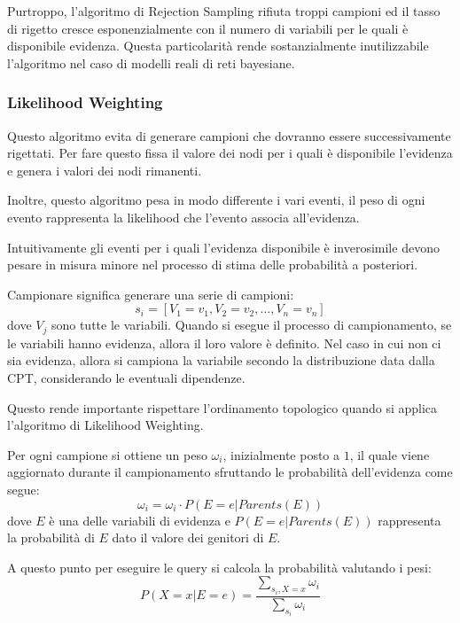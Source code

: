 Purtroppo, l'algoritmo di Rejection Sampling rifiuta troppi campioni ed il tasso
di rigetto cresce esponenzialmente con il numero di variabili per le quali è
disponibile evidenza. Questa particolarità rende sostanzialmente inutilizzabile
l'algoritmo nel caso di modelli reali di reti bayesiane.

\subsubsection{Likelihood Weighting}
Questo algoritmo evita di generare campioni che dovranno essere successivamente
rigettati. Per fare questo fissa il valore dei nodi per i quali è disponibile
l'evidenza e genera i valori dei nodi rimanenti.

Inoltre, questo algoritmo pesa in modo differente i vari eventi, il peso di ogni
evento rappresenta la likelihood che l'evento associa all'evidenza.

Intuitivamente gli eventi per i quali l'evidenza disponibile è inverosimile devono
pesare in misura minore nel processo di stima delle probabilità a posteriori.

Campionare significa generare una serie di campioni:
\begin{equation*}
    s_i = \left[V_1=v_1, V_2= v_2, \dots, V_n=v_n\right]
\end{equation*}
dove $V_j$ sono tutte le variabili. Quando si esegue il processo di campionamento,
se le variabili hanno evidenza, allora il loro valore è definito. Nel caso in
cui non ci sia evidenza, allora si campiona la variabile secondo la distribuzione
data dalla CPT, considerando le eventuali dipendenze.


Questo rende importante rispettare l'ordinamento topologico quando si applica
l'algoritmo di Likelihood Weighting.

Per ogni campione si ottiene un peso $\omega_i$, inizialmente posto a $1$, il
quale viene aggiornato durante il campionamento sfruttando le probabilità
dell'evidenza come segue:
\begin{equation*}
    \omega_i = \omega_i \cdot P(E = e | Parents(E))
\end{equation*}
dove $E$ è una delle variabili di evidenza e $P(E=e | Parents(E))$ rappresenta la
probabilità di $E$ dato il valore dei genitori di $E$.

A questo punto per eseguire le query si calcola la probabilità valutando i pesi:
\begin{equation*}
    P(X = x | E = e) = \frac{\sum_{s_i, X=x} \omega_i}{\sum_{s_i} \omega_i}
\end{equation*}
